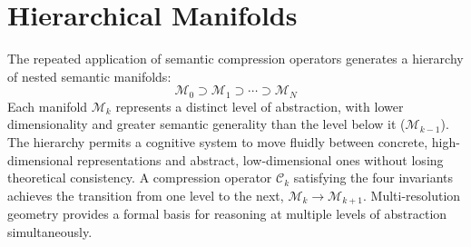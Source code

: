 \section{Hierarchical Manifolds}

The repeated application of semantic compression operators generates a hierarchy of nested semantic manifolds:
\begin{equation}
\mathcal{M}_0 \supset \mathcal{M}_1 \supset \cdots \supset \mathcal{M}_N
\end{equation}
Each manifold \(\mathcal{M}_k\) represents a distinct level of abstraction, with lower dimensionality and greater semantic generality than the level below it (\(\mathcal{M}_{k-1}\)). The hierarchy permits a cognitive system to move fluidly between concrete, high-dimensional representations and abstract, low-dimensional ones without losing theoretical consistency. A compression operator \(\mathcal{C}_k\) satisfying the four invariants achieves the transition from one level to the next, \(\mathcal{M}_k \to \mathcal{M}_{k+1}\). Multi-resolution geometry provides a formal basis for reasoning at multiple levels of abstraction simultaneously.
